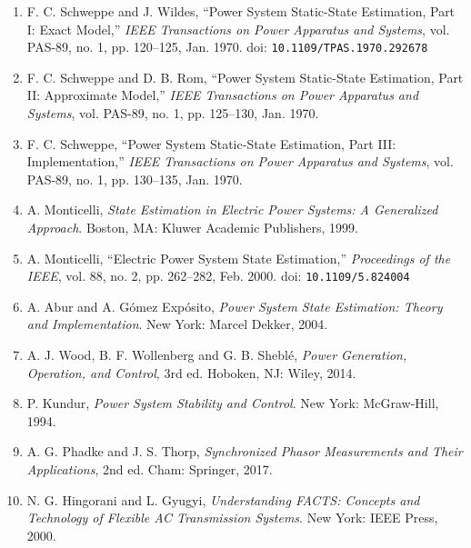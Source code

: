 \begin{enumerate}

\item F. C. Schweppe and J. Wildes, ``Power System Static-State Estimation, Part I: Exact Model,''
      \textit{IEEE Transactions on Power Apparatus and Systems}, vol. PAS-89, no. 1, pp. 120--125,
      Jan. 1970. doi: \texttt{10.1109/TPAS.1970.292678}

\item F. C. Schweppe and D. B. Rom, ``Power System Static-State Estimation, Part II: Approximate
      Model,'' \textit{IEEE Transactions on Power Apparatus and Systems}, vol. PAS-89, no. 1,
      pp. 125--130, Jan. 1970.

\item F. C. Schweppe, ``Power System Static-State Estimation, Part III: Implementation,''
      \textit{IEEE Transactions on Power Apparatus and Systems}, vol. PAS-89, no. 1, pp. 130--135,
      Jan. 1970.

\item A. Monticelli, \textit{State Estimation in Electric Power Systems: A Generalized Approach}.
      Boston, MA: Kluwer Academic Publishers, 1999.

\item A. Monticelli, ``Electric Power System State Estimation,'' \textit{Proceedings of the IEEE},
      vol. 88, no. 2, pp. 262--282, Feb. 2000.
      doi: \texttt{10.1109/5.824004}

\item A. Abur and A. Gómez Expósito, \textit{Power System State Estimation: Theory and
      Implementation}. New York: Marcel Dekker, 2004.

\item A. J. Wood, B. F. Wollenberg and G. B. Sheblé, \textit{Power Generation, Operation, and
      Control}, 3rd ed. Hoboken, NJ: Wiley, 2014.

\item P. Kundur, \textit{Power System Stability and Control}. New York: McGraw-Hill, 1994.

\item A. G. Phadke and J. S. Thorp, \textit{Synchronized Phasor Measurements and Their
      Applications}, 2nd ed. Cham: Springer, 2017.

\item N. G. Hingorani and L. Gyugyi, \textit{Understanding FACTS: Concepts and Technology of
      Flexible AC Transmission Systems}. New York: IEEE Press, 2000.


\end{enumerate}
